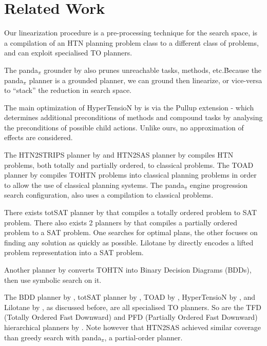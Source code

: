 	


\section{Related Work}
Our linearization procedure is a pre-processing technique for the search space, is a compilation of an HTN planning problem class to a different class of problems, and can exploit specialised TO planners.

The panda$_\pi$ grounder by \cite{Behnke2020Grounding} also prunes unreachable tasks, methods, etc.\.  Because the panda$_{\pi}$ planner is a grounded planner, we can ground then linearize, or vice-versa to \enquote{stack} the reduction in search space. 

The main optimization of HyperTensioN by \cite{hypertension} is via the Pullup extension - which determines additional preconditions of methods and compound tasks by analysing the preconditions of possible child actions. Unlike ours, no approximation of effects are considered.  


The HTN2STRIPS planner by \cite{HTN2STRIPS} and HTN2SAS planner by \cite{HTN2SAS} compiles HTN problems, both totally and partially ordered, to classical problems. The TOAD planner by \cite{HollerTOAD} compiles TOHTN problems into classical planning problems in order to allow the use of classical planning systems. The panda$_\pi$ engine progression search configuration, also uses a compilation to classical problems.

There exists totSAT planner by \cite{TOtoSAT} that compiles a totally ordered problem to SAT problem. There also exists 2 planners by \cite{POtoSAT, OptimalPOtoSAT} that compiles a partially ordered problem to a SAT problem. One searches for optimal plans, the other focuses on finding any solution as quickly as possible. Lilotane by \cite{Lilotane} directly encodes a lifted problem representation into a SAT problem.

Another planner by \cite{Behnke_Speck_2021} converts TOHTN into Binary Decision Diagrams (BDDs), then use symbolic search on it.

The BDD planner by \cite{Behnke_Speck_2021}, totSAT planner by \cite{TOtoSAT}, TOAD by \cite{HollerTOAD}, HyperTensioN by \cite{hypertension}, and Lilotane by \cite{Lilotane}, as discussed before, are all specialised TO planners. So are the TFD (Totally Ordered Fast Downward) and PFD (Partially Ordered Fast Downward) hierarchical planners by \cite{PDDL4J}.  Note however that HTN2SAS achieved similar coverage than greedy search with panda$_\pi$, a partial-order planner.
